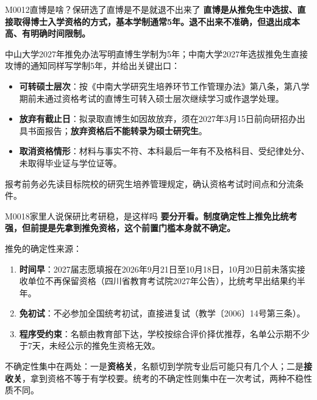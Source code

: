 \begin{qa}{M0012}{直博是啥？保研选了直博是不是就退不出来了}
\textbf{直博是从推免生中选拔、直接取得博士入学资格的方式，基本学制通常5年。退不出来不准确，但退出成本高、有明确时间限制。}

中山大学2027年推免办法写明直博生学制为5年；中南大学2027年选拔推免生直接攻博的通知同样写学制5年，并给出关键出口：

\begin{itemize}
  \item \textbf{可转硕士层次}：按《中南大学研究生培养环节工作管理办法》第八条，第八学期前未通过资格考试的直博生可转入硕士层次继续学习或作退学处理。
  \item \textbf{放弃有截止日}：拟录取直博生如因故放弃，须在2027年3月15日前向研招办出具书面报告；\textbf{放弃资格后不能转录为硕士研究生}。
  \item \textbf{取消资格情形}：材料与事实不符、本科最后一年有不及格科目、受纪律处分、未取得毕业证与学位证等。
\end{itemize}

报考前务必先读目标院校的研究生培养管理规定，确认资格考试时间点和分流条件。
\end{qa}

\begin{qa}{M0018}{家里人说保研比考研稳，是这样吗}
\textbf{要分开看。制度确定性上推免比统考强，但前提是先拿到推免资格，这个前置门槛本身就不确定。}

推免的确定性来源：

\begin{enumerate}
  \item \textbf{时间早}：2027届志愿填报在2026年9月21日至10月18日，10月20日前未落实接收单位不再保留资格（四川省教育考试院2027年公告），比统考早出结果约半年。
  \item \textbf{免初试}：不必参加全国统考初试，直接进复试（教学〔2006〕14号第三条）。
  \item \textbf{程序受约束}：名额由教育部下达，学校按综合评价择优推荐，名单公示期不少于7天，未经公示的推免生资格无效。
\end{enumerate}

不确定性集中在两处：一是\textbf{资格关}，名额切到学院专业后可能只有几个人；二是\textbf{接收关}，拿到资格不等于有学校要。统考的不确定性则集中在一次考试，两种不稳性质不同。
\end{qa}

